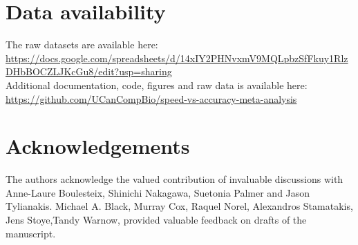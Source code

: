 \documentclass[fleqn,10pt]{SelfArx} %
\begin{document}
\section*{Data availability}
The raw datasets are available here:\\
\fussy
\url{https://docs.google.com/spreadsheets/d/14xIY2PHNvxmV9MQLpbzSfFkuy1RlzDHbBOCZLJKcGu8/edit?usp=sharing}\\
\sloppy
Additional documentation, code, figures and raw data is available here:\\
\fussy
\url{https://github.com/UCanCompBio/speed-vs-accuracy-meta-analysis}
\sloppy

\section*{Acknowledgements}
The authors acknowledge the valued contribution of invaluable discussions with Anne-Laure Boulesteix, Shinichi Nakagawa, Suetonia Palmer and Jason Tylianakis. Michael A. Black,  Murray Cox, Raquel Norel, Alexandros Stamatakis, Jens Stoye,Tandy Warnow, provided valuable feedback on drafts of the manuscript. 



\end{document}
